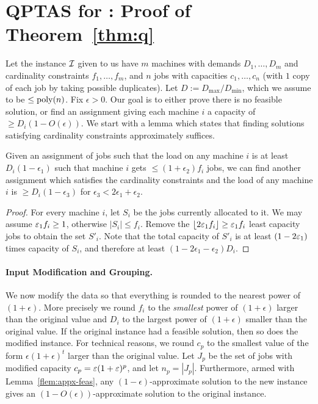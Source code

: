 \section{QPTAS for \cckp: Proof of Theorem~\ref{thm:q}} \label{sec:qptas}
\def\pv{\mathbf{b}}
\renewcommand{\dem}{\mathsf{cap}}
Let the instance ${\cal I}$ given to us have $m$ machines with demands $D_1,\ldots,D_m$ and cardinality constraints $f_1,\ldots,f_m$, and $n$ jobs with capacities
$c_1,\ldots,c_n$ (with $1$ copy of each job by taking possible duplicates). Let $D:= D_\mathrm{max}/D_\mathrm{min}$, which we assume to be $\leq \mathrm{poly}(n)$.
Fix $\epsilon> 0$. Our goal is to either prove there is no feasible solution, or find an assignment
giving each machine $i$ a capacity of $\geq D_i(1-O(\epsilon))$.
We start with a lemma which states that finding solutions satisfying cardinality constraints approximately suffices.
\begin{lemma}\label{flem:appx-feas}
	Given an assignment of jobs such that the load on any machine $i$  is at least $D_i(1 - \epsilon_1)$ such that machine $i$ gets $\leq (1+\epsilon_2)f_i$ jobs,
	we can find another assignment which satisfies the cardinality constraints and the load of any machine $i$ is $\geq D_i(1 - \epsilon_3)$ for $\epsilon_3 < 2\epsilon_1+\epsilon_2$.
\end{lemma}
\begin{proof}
For every machine $i$, let $S_i$ be the jobs currently allocated to it. We may assume $\varepsilon_1 f_i \geq 1$, otherwise $|S_i| \leq f_i$.
Remove the $\lfloor2\varepsilon_1 f_i\rfloor \geq \varepsilon_1 f_i$ least capacity jobs to obtain the set $S'_i$. Note that the total capacity of $S'_i$ is at least $(1-2\varepsilon_1)$ times capacity of $S_i$, and therefore
at least $(1-2\epsilon_1 - \epsilon_2)D_i$.
\end{proof}
\noindent
\paragraph{Input Modification and Grouping.}
We now modify the data so that everything is rounded to the nearest power of $(1+\epsilon)$. More precisely we round  $f_i$  to the {\em smallest} power of $(1+\epsilon)$ larger than the original value and $D_i$ to the largest power of $(1+\epsilon)$ smaller than the original value.
If the original instance had a feasible solution, then so does the modified instance.
For technical reasons, we round $c_p$ to the smallest value of the form $\epsilon(1+\epsilon)^t$ larger than the original value.
Let $J_p$ be the set of jobs with modified capacity $c_p = \varepsilon (1+\varepsilon)^p$, and let $n_p = |J_p|$. Furthermore, armed with Lemma~\ref{flem:appx-feas}, any $(1-\epsilon)$-approximate solution to the new instance gives an $(1-O(\epsilon))$-approximate solution to the original instance.  \smallskip


